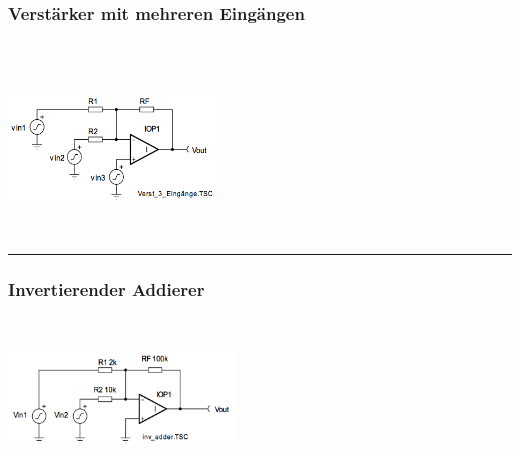 		\subsubsection{Verstärker mit mehreren Eingängen }
			\begin{minipage}{12.5cm}
            	\hspace*{10mm}
            	\hspace{15mm}\\
            	\hspace*{10mm}\\
            	\hspace*{10mm}
            \end{minipage}
			\begin{minipage}{5.5cm}
            	\includegraphics[width=5.5cm]{./bilder/3-eingaenge.png}
            \end{minipage}\\

\hrule

		\subsubsection{Invertierender Addierer }
			\begin{minipage}[b]{12cm}
            \hspace*{10mm}\\
            \hspace*{10mm}
           	\hspace*{10mm}
            \end{minipage}
			\begin{minipage}{6cm}
            	\includegraphics[width=6cm]{./bilder/invertadd.png}
            \end{minipage}\\

